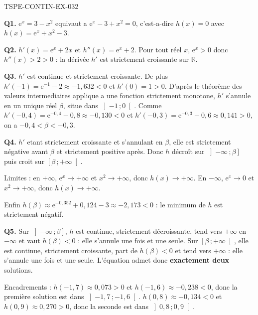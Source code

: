 \begin{corrige}{TSPE-CONTIN-EX-032}

\textbf{Q1.} $\mathrm{e}^{x} = 3 - x^2$ equivaut a $\mathrm{e}^{x} - 3 + x^2 = 0$, c'est-a-dire $h(x) = 0$ avec $h(x) = \mathrm{e}^{x} + x^2 - 3$.

\textbf{Q2.} $h'(x) = \mathrm{e}^{x} + 2x$ et $h''(x) = \mathrm{e}^{x} + 2$. Pour tout réel $x$, $\mathrm{e}^{x} > 0$ donc $h''(x) > 2 > 0$ : la dérivée $h'$ est strictement croissante sur $\mathbb{R}$.

\textbf{Q3.} $h'$ est continue et strictement croissante. De plus $h'(-1) = \mathrm{e}^{-1} - 2 \approx -1{,}632 < 0$ et $h'(0) = 1 > 0$. D'après le théorème des valeurs intermediaires applique a une fonction strictement monotone, $h'$ s'annule en un unique réel $\beta$, situe dans $\left]-1\,;0\right[$. Comme $h'(-0{,}4) = \mathrm{e}^{-0{,}4} - 0{,}8 \approx -0{,}130 < 0$ et $h'(-0{,}3) = \mathrm{e}^{-0{,}3} - 0{,}6 \approx 0{,}141 > 0$, on a $-0{,}4 < \beta < -0{,}3$.

\textbf{Q4.} $h'$ etant strictement croissante et s'annulant en $\beta$, elle est strictement négative avant $\beta$ et strictement positive après. Donc $h$ décroît sur $\left]-\infty\,;\beta\right]$ puis croit sur $\left[\beta\,;+\infty\right[$.

Limites : en $+\infty$, $\mathrm{e}^{x} \to +\infty$ et $x^2 \to +\infty$, donc $h(x) \to +\infty$. En $-\infty$, $\mathrm{e}^{x} \to 0$ et $x^2 \to +\infty$, donc $h(x) \to +\infty$.

Enfin $h(\beta) \approx \mathrm{e}^{-0{,}352} + 0{,}124 - 3 \approx -2{,}173 < 0$ : le minimum de $h$ est strictement négatif.

\textbf{Q5.} Sur $\left]-\infty\,;\beta\right]$, $h$ est continue, strictement décroissante, tend vers $+\infty$ en $-\infty$ et vaut $h(\beta) < 0$ : elle s'annule une fois et une seule. Sur $\left[\beta\,;+\infty\right[$, elle est continue, strictement croissante, part de $h(\beta) < 0$ et tend vers $+\infty$ : elle s'annule une fois et une seule. L'équation admet donc \textbf{exactement deux} solutions.

Encadrements : $h(-1{,}7) \approx 0{,}073 > 0$ et $h(-1{,}6) \approx -0{,}238 < 0$, donc la première solution est dans $\left]-1{,}7\,;-1{,}6\right[$. $h(0{,}8) \approx -0{,}134 < 0$ et $h(0{,}9) \approx 0{,}270 > 0$, donc la seconde est dans $\left]0{,}8\,;0{,}9\right[$.
\end{corrige}
